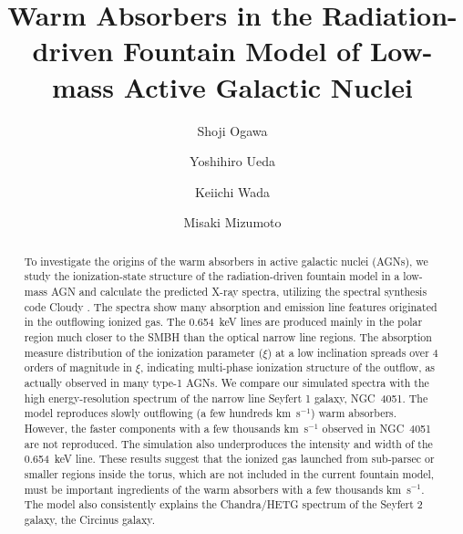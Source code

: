 \documentclass[twocolumn,times,twocolappendix]{aastex63}
\begin{document}
\title{Warm Absorbers in the Radiation-driven Fountain Model of
Low-mass Active Galactic Nuclei}




\author[0000-0002-5701-0811]{Shoji Ogawa}

\author[0000-0001-7821-6715]{Yoshihiro Ueda}

\author[0000-0002-8779-8486]{Keiichi Wada}

\author[0000-0003-2161-0361]{Misaki Mizumoto}










\begin{abstract}

To investigate the origins of the warm absorbers in active galactic
nuclei (AGNs), we study the ionization-state structure of the
radiation-driven fountain model in a low-mass AGN \citep{Wada2016} %
and calculate the predicted X-ray spectra, utilizing
the spectral synthesis code \textsf{Cloudy} \citep{Ferland2017}. %
The spectra show many absorption and emission line features originated
in the outflowing ionized gas. The  0.654~keV lines are produced
mainly in the polar region much closer to the SMBH than the optical
narrow line regions. The absorption measure distribution of the
ionization parameter ($\xi$) at a low inclination
spreads over 4 orders of magnitude in $\xi$,
indicating multi-phase ionization structure of the outflow, as
actually observed in many type-1 AGNs.
We compare our simulated spectra with the high
energy-resolution spectrum of the narrow line Seyfert 1 galaxy, NGC~4051.  
The model reproduces
slowly outflowing (a few hundreds km~s$^{-1}$) warm absorbers.
However, the faster components with a few thousands km~s$^{-1}$ observed in NGC~4051 are not reproduced.
The simulation also underproduces the intensity and width of the 
0.654~keV line.
These results suggest that the ionized gas launched from sub-parsec or smaller regions
inside the torus, which are not included in the current
fountain model, must be important ingredients of the warm absorbers with a few thousands km~s$^{-1}$.
The model also consistently explains the Chandra/HETG spectrum of the Seyfert 2 galaxy, the Circinus galaxy.



\end{abstract}
\end{document}

